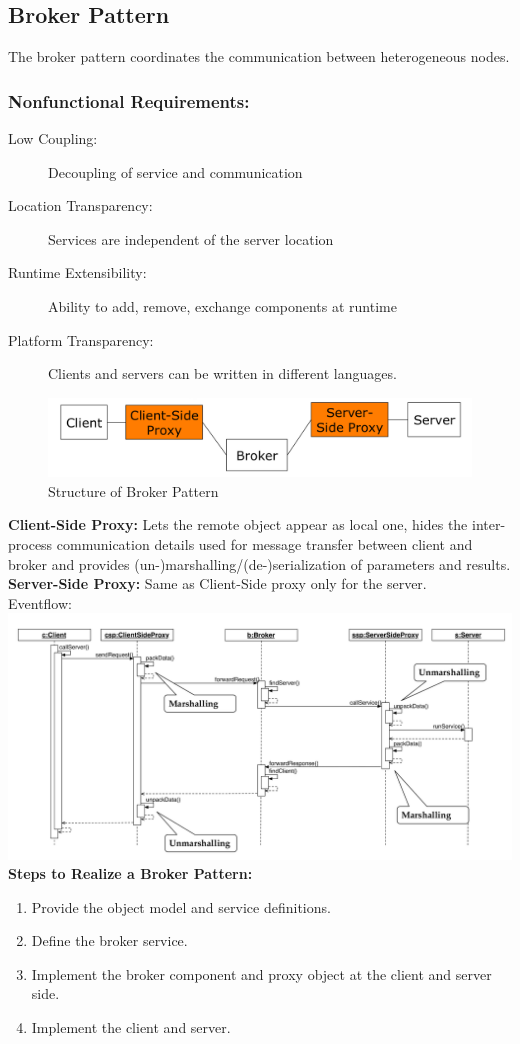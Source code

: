 \subsection{Broker Pattern}
The broker pattern coordinates the communication between heterogeneous nodes.
\subsubsection*{Nonfunctional Requirements:}
\begin{description}
  \item[Low Coupling:] Decoupling of service and communication
  \item[Location Transparency:] Services are independent of the server location
  \item[Runtime Extensibility:] Ability to add, remove, exchange components at runtime
  \item[Platform Transparency:] Clients and servers can be written in different languages.
\end{description}

\begin{figure}[H]
	\centering
	\includegraphics[width=0.9\linewidth]{images/pattern_broker.png}
	\caption{Structure of Broker Pattern}
\end{figure}

\textbf{Client-Side Proxy:} Lets the remote object appear as local one, hides the inter-process communication details used for message transfer between client and broker and provides (un-)marshalling/(de-)serialization of parameters and results.\\
\textbf{Server-Side Proxy:} Same as Client-Side proxy only for the server.\\
Eventflow:\\
\includegraphics[width=\linewidth]{images/eventflow_broker.png}
\textbf{Steps to Realize a Broker Pattern:}
\begin{enumerate}
  \item Provide the object model and service definitions.
  \item Define the broker service.
  \item Implement the broker component and proxy object at the client and server side.
  \item Implement the client and server.
\end{enumerate}


\newpage
